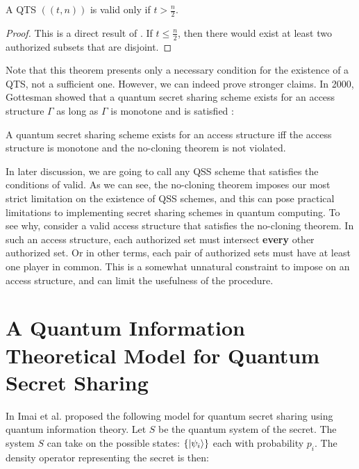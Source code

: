 \begin{corollary}
    \label{cor:qts}
    A QTS $((t,n))$ is valid only if $t > \frac{n}{2}$.
\end{corollary}

\begin{proof}
    This is a direct result of . If $t \leq \frac{n}{2}$, then there would exist at least two authorized subsets that are disjoint. 
\end{proof}

Note that this theorem presents only a necessary condition for the existence of a QTS, not a sufficient one. However, we can indeed prove stronger claims. In 2000, Gottesman showed that a quantum secret sharing scheme exists for an access structure $\Gamma$ as long as $\Gamma$ is monotone and  is satisfied \cite{gottesman_theory_2000}:

\begin{theorem}
    \label{thm:monotone-gamma}
    A quantum secret sharing scheme exists for an access structure iff the access structure is monotone and the no-cloning theorem is not violated.
\end{theorem}

In later discussion, we are going to call any QSS scheme that satisfies the conditions of  valid. As we can see, the no-cloning theorem imposes our most strict limitation on the existence of QSS schemes, and this can pose practical limitations to implementing secret sharing schemes in quantum computing. To see why, consider a valid access structure that satisfies the no-cloning theorem. In such an access structure, each authorized set must intersect \textbf{every} other authorized set. Or in other terms, each pair of authorized sets must have at least one player in common. This is a somewhat unnatural constraint to impose on an access structure, and can limit the usefulness of the procedure.

\section{A Quantum Information Theoretical Model for Quantum Secret Sharing}

In \cite{imai_quantum_2003} Imai et al. proposed the following model for quantum secret sharing using quantum information theory. Let $S$ be the quantum system of the secret. The system $S$ can take on the possible states: $\{\ket{\psi_i}\}$ each with probability $p_i$. The density operator representing the secret is then:


